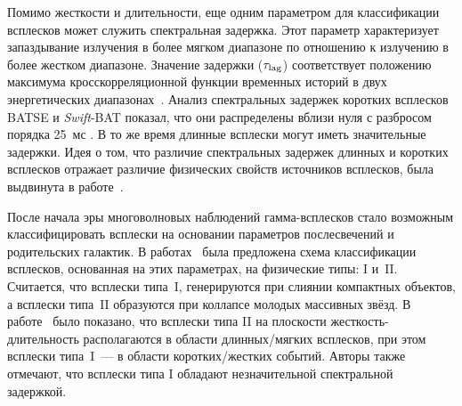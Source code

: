 Помимо жесткости и длительности, еще одним параметром для классификации всплесков 
может служить спектральная задержка. Этот параметр характеризует запаздывание 
излучения в более мягком диапазоне по отношению к излучению в более жестком диапазоне. 
Значение задержки ($\tau_{\mathrm{lag}}$) соответствует положению  максимума 
кросскорреляционной функции временных историй в двух энергетических диапазонах~\citep{Norris_2000}. 
Анализ спектральных задержек коротких всплесков BATSE и \textit{Swift}-BAT показал, 
что они распределены вблизи нуля с разбросом 
порядка 25~мс \citep{Norris_and_Bonnel_2006ApJ, Norris_2011ApJ}. В то же время длинные 
всплески могут иметь значительные задержки. Идея о том, что различие спектральных 
задержек длинных и коротких всплесков отражает различие физических свойств источников 
всплесков, была выдвинута в работе~\citep{Gehrels_2006_Nature}.


После начала эры многоволновых наблюдений гамма-всплесков стало возможным 
классифицировать всплески на основании параметров послесвечений и родительских галактик. 
В работах~\citep{Zhang_2006, Zhang_2007, Zhang_2009} была предложена схема классификации всплесков, 
основанная на этих параметрах, на физические типы: I и~II. Считается, что всплески типа~I, 
генерируются при слиянии компактных объектов, а всплески типа~II образуются 
при коллапсе молодых массивных звёзд. В работе~\citep{Zhang_2009} было показано, 
что всплески типа II на плоскости жесткость-длительность располагаются в области 
длинных/мягких всплесков, при этом всплески типа~I~--- в области коротких/жестких событий. 
Авторы также отмечают, что всплески типа I обладают незначительной спектральной задержкой.

